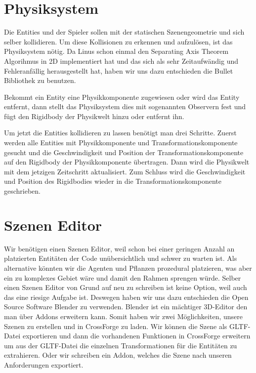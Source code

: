 \section{Physiksystem}

Die Entities und der Spieler sollen mit der statischen Szenengeometrie und sich selber kollidieren. Um diese Kollisionen zu erkennen und aufzulösen, ist das Physiksystem nötig. Da Linus schon einmal den Separating Axis Theorem Algorihmus in 2D implementiert hat und das sich als sehr Zeitaufwändig und Fehleranfällig herausgestellt hat, haben wir uns dazu entschieden die Bullet Bibliothek zu benutzen. 

Bekommt ein Entity eine Physikkomponente zugewiesen oder wird das Entity entfernt, dann stellt das Physiksystem dies mit sogenannten Observern fest und fügt den Rigidbody der Physikwelt hinzu oder entfernt ihn.

Um jetzt die Entities kollidieren zu lassen benötigt man drei Schritte. Zuerst werden alle Entities mit Physikkomponente und Transformationskomponente gesucht und die Geschwindigkeit und Position der Transformationskomponente auf den Rigidbody der Physikkomponente übertragen. Dann wird die Physikwelt mit dem jetzigen Zeitschritt aktualisiert. Zum Schluss wird die Geschwindigkeit und Position des Rigidbodies wieder in die Transformationskomponente geschrieben.


\section{Szenen Editor}

Wir benötigen einen Szenen Editor, weil schon bei einer geringen Anzahl an platzierten Entitäten der Code unübersichtlich und schwer zu warten ist. Als alternative könnten wir die Agenten und Pflanzen prozedural platzieren, was aber ein zu komplexes Gebiet wäre und damit den Rahmen sprengen würde. Selber einen Szenen Editor von Grund auf neu zu schreiben ist keine Option, weil auch das eine riesige Aufgabe ist. Deswegen haben wir uns dazu entschieden die Open Source Software Blender zu verwenden. Blender ist ein mächtiger 3D-Editor den man über Addons erweitern kann. Somit haben wir zwei Möglichkeiten, unsere Szenen zu erstellen und in CrossForge zu laden. Wir können die Szene als GLTF-Datei exportieren und dann die vorhandenen Funktionen in CrossForge erweitern um aus der GLTF-Datei die einzelnen Transformationen für die Entitäten zu extrahieren. Oder wir schreiben ein Addon, welches die Szene nach unseren Anforderungen exportiert.

